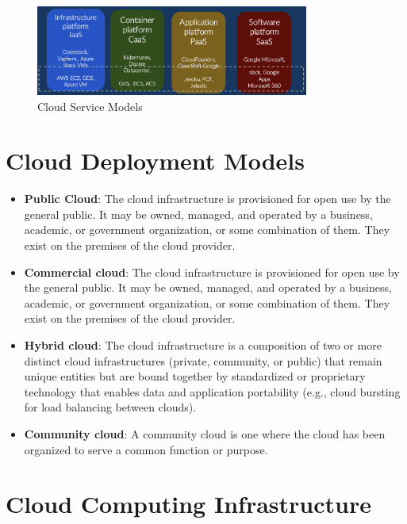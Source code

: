 \begin{figure}[H]
    \centering
    \includegraphics[width=0.8\textwidth]{assets/fig13.png}
    \caption{Cloud Service Models}
    \label{fig:cloud-service-models}
\end{figure}

\section{Cloud Deployment Models}

\begin{itemize}
    \item \textbf{Public Cloud}: The cloud infrastructure is provisioned for open use by the general public. It may be owned, managed, and operated by a business, academic, or government organization, or some combination of them. They exist on the premises of the cloud provider.
    \item \textbf{Commercial cloud}: The cloud infrastructure is provisioned for open use by the general public. It may be owned, managed, and operated by a business, academic, or government organization, or some combination of them. They exist on the premises of the cloud provider.
    \item \textbf{Hybrid cloud}: The cloud infrastructure is a composition of two or more distinct cloud infrastructures (private, community, or public) that remain unique entities but are bound together by standardized or proprietary technology that enables data and application portability (e.g., cloud bursting for load balancing between clouds).
    \item \textbf{Community cloud}: A community cloud is one where the cloud has been
    organized to serve a common function or purpose.
\end{itemize}

\section{Cloud Computing Infrastructure}


